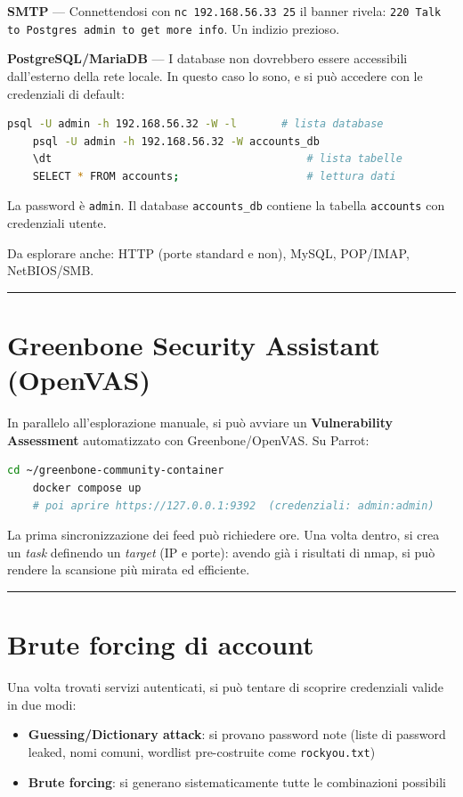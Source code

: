 \documentclass[12pt, a4paper]{report}
\begin{document}
\textbf{SMTP} --- Connettendosi con \texttt{nc 192.168.56.33 25} il banner rivela: \texttt{220 Talk to Postgres admin to get more info}. Un indizio prezioso.

\textbf{PostgreSQL/MariaDB} --- I database non dovrebbero essere accessibili dall'esterno della rete locale. In questo caso lo sono, e si può accedere con le credenziali di default:

\begin{lstlisting}[language=bash]
	psql -U admin -h 192.168.56.32 -W -l       # lista database
	psql -U admin -h 192.168.56.32 -W accounts_db
	\dt                                        # lista tabelle
	SELECT * FROM accounts;                    # lettura dati
\end{lstlisting}

La password è \texttt{admin}. Il database \texttt{accounts\_db} contiene la tabella \texttt{accounts} con credenziali utente.

Da esplorare anche: HTTP (porte standard e non), MySQL, POP/IMAP, NetBIOS/SMB.

\noindent\rule{\textwidth}{0.4pt}

\section{Greenbone Security Assistant (OpenVAS)}
In parallelo all'esplorazione manuale, si può avviare un \textbf{Vulnerability Assessment} automatizzato con Greenbone/OpenVAS. Su Parrot:

\begin{lstlisting}[language=bash]
	cd ~/greenbone-community-container
	docker compose up
	# poi aprire https://127.0.0.1:9392  (credenziali: admin:admin)
\end{lstlisting}

La prima sincronizzazione dei feed può richiedere ore. Una volta dentro, si crea un \textit{task} definendo un \textit{target} (IP e porte): avendo già i risultati di nmap, si può rendere la scansione più mirata ed efficiente.

\noindent\rule{\textwidth}{0.4pt}

\section{Brute forcing di account}
Una volta trovati servizi autenticati, si può tentare di scoprire credenziali valide in due modi:
\begin{itemize}
	\item \textbf{Guessing/Dictionary attack}: si provano password note (liste di password leaked, nomi comuni, wordlist pre-costruite come \texttt{rockyou.txt})
	\item \textbf{Brute forcing}: si generano sistematicamente tutte le combinazioni possibili
\end{itemize}
\end{document}
